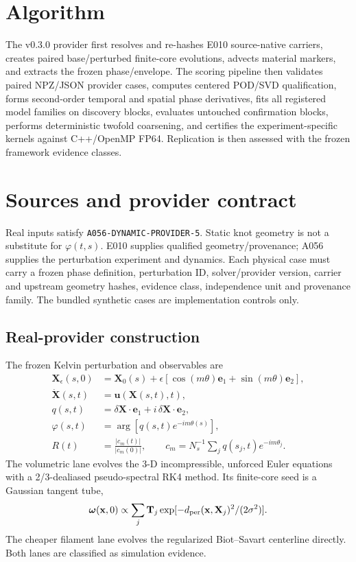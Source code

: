 \documentclass[11pt,a4paper]{article}
\newcommand{\code}[1]{\texttt{#1}}
\begin{document}
\section{Algorithm}
The v0.3.0 provider first resolves and re-hashes E010 source-native carriers, creates paired base/perturbed finite-core evolutions, advects material markers, and extracts the frozen phase/envelope. The scoring pipeline then validates paired NPZ/JSON provider cases, computes centered POD/SVD qualification, forms second-order temporal and spatial phase derivatives, fits all registered model families on discovery blocks, evaluates untouched confirmation blocks, performs deterministic twofold coarsening, and certifies the experiment-specific kernels against C++/OpenMP FP64. Replication is then assessed with the frozen framework evidence classes.


\section{Sources and provider contract}
Real inputs satisfy \code{A056-DYNAMIC-PROVIDER-5}. Static knot geometry is not a substitute for $\varphi(t,s)$. E010 supplies qualified geometry/provenance; A056 supplies the perturbation experiment and dynamics. Each physical case must carry a frozen phase definition, perturbation ID, solver/provider version, carrier and upstream geometry hashes, evidence class, independence unit and provenance family. The bundled synthetic cases are implementation controls only.

\subsection{Real-provider construction}
The frozen Kelvin perturbation and observables are
\begin{align}
\mathbf X_\epsilon(s,0)&=\mathbf X_0(s)+\epsilon[\cos(m\theta)\mathbf e_1+\sin(m\theta)\mathbf e_2],\\
\dot{\mathbf X}(s,t)&=\mathbf u(\mathbf X(s,t),t),\\
q(s,t)&=\delta\mathbf X\cdot\mathbf e_1+i\,\delta\mathbf X\cdot\mathbf e_2,\\
\varphi(s,t)&=\arg[q(s,t)e^{-im\theta(s)}],\\
R(t)&=\frac{|c_m(t)|}{|c_m(0)|},\qquad c_m=N_s^{-1}\sum_jq(s_j,t)e^{-im\theta_j}.
\end{align}
The volumetric lane evolves the 3-D incompressible, unforced Euler equations with a 2/3-dealiased pseudo-spectral RK4 method. Its finite-core seed is a Gaussian tangent tube,
\[
\boldsymbol\omega(\mathbf x,0)\propto\sum_j\mathbf T_j\exp[-d_{\rm per}(\mathbf x,\mathbf X_j)^2/(2\sigma^2)].
\]
The cheaper filament lane evolves the regularized Biot--Savart centerline directly. Both lanes are classified as simulation evidence.
\end{document}
